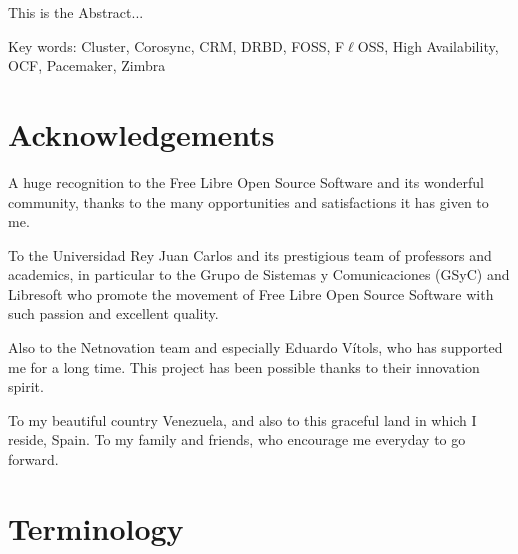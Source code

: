 \documentclass[a4paper, 12pt]{book}
\begin{document}
This is the Abstract...

\noindent
Key words: Cluster, Corosync, CRM, DRBD, FOSS, F$\ell$OSS, High Availability, OCF, Pacemaker, Zimbra

%
\chapter*{Acknowledgements}
\label{chap:acknowledgements}

\noindent A huge recognition to the Free Libre Open Source Software and its wonderful community, thanks to the many opportunities and satisfactions it has given to me.\bigskip

\noindent To the Universidad Rey Juan Carlos and its prestigious team of professors and academics, in particular to the Grupo de Sistemas y Comunicaciones (GSyC) and Libresoft who promote the movement of Free Libre Open Source Software with such passion and excellent quality.\bigskip

\noindent Also to the Netnovation team and especially Eduardo V\'{i}tols, who has supported me for a long time. This project has been possible thanks to their innovation spirit.\bigskip

\noindent To my beautiful country Venezuela, and also to this graceful land in which I reside, Spain. To my family and friends, who encourage me everyday to go forward.


%
\chapter*{Terminology}
\label{chap:terminology}
\end{document}
